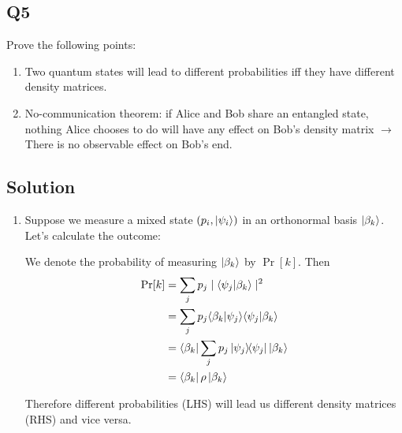 \documentclass[12pt]{article}
\begin{document}
\begin{appendices}
\subsection*{Q5}

Prove the following points:
\begin{enumerate}[label=\alph*)]
    \item Two quantum states will lead to different probabilities iff they have different density matrices.
    
    \item No-communication theorem: if Alice and Bob share an entangled state, nothing Alice chooses to do will have any effect on Bob's density matrix $\rightarrow$ There is no observable effect on Bob's end.
\end{enumerate}

\subsection*{Solution}
\begin{enumerate}[label=\alph*)]
\item 


    Suppose we measure a mixed state  $(p_i, \ket{\psi_i}) $ in an orthonormal basis $\ket{\beta_k}$.
    Let's calculate the outcome:
    
    We denote the probability of measuring $\ket{\beta_k}$ by $\Pr[k]$. Then
        \begin{alignat}{1}
            \Pr[k] 
            &= \sum_{j} p_j \mid  {\braket{\psi_j}{\beta_k}} \mid ^2 \\
            &= \sum_{j} p_j {\braket{\beta_k}{\psi_j}}{\braket{\psi_j}{\beta_k}} \\
            &= \bra{\beta_k} \sum_{j} p_j \ketbra{\psi_j}{\psi_j} \ket{\beta_k} \\
            &= \bra{\beta_k} \rho \ket{\beta_k}
        \end{alignat}
        
        Therefore different probabilities (LHS) will lead us different density matrices (RHS) and vice versa.




\end{enumerate}
\end{appendices}
\end{document}
